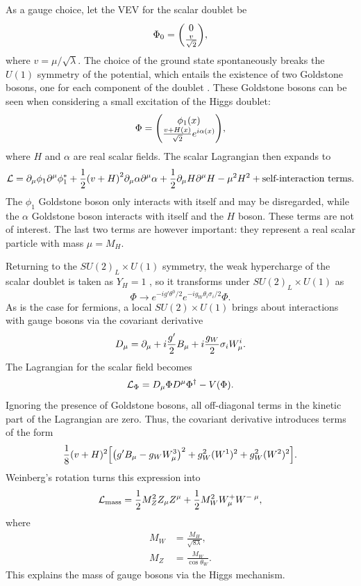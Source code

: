 As a gauge choice, let the VEV for the scalar doublet be
\begin{equation}
    \Phi_0 = \mqty (0 \\ \frac{v}{\sqrt{2}}),
\end{equation}
where $v=\mu/\sqrt{\lambda}$. The choice of the ground state spontaneously breaks the $U(1)$ symmetry of the potential, which entails the existence of two Goldstone bosons, one for each component of the doublet \cite{goldberg_standard_2017}. These Goldstone bosons can be seen when considering a small excitation of the Higgs doublet:
\begin{equation}
    \Phi =\mqty (\phi_1(x) \\ \frac{v+H(x)}{\sqrt{2}}e^{i\alpha(x)}),
\end{equation}
where $H$ and $\alpha$ are real scalar fields.
The scalar Lagrangian then expands to
\begin{equation}
    \mathcal{L} = \partial_{\mu} \phi_1 \partial^{\mu} \phi_1^* + \frac{1}{2}\qty(v+H)^2 \partial_{\mu} \alpha \partial^{\mu} \alpha + \frac{1}{2}\partial_{\mu} H \partial^{\mu} H - \mu^2 H^2 + \text{self-interaction terms}.
\end{equation}
The $\phi_1$ Goldstone boson only interacts with itself and may be disregarded, while the $\alpha$ Goldstone boson interacts with itself and the $H$ boson. These terms are not of interest. The last two terms are however important: they represent a real scalar particle with mass $\mu = M_H$.

Returning to the $SU(2)_L\times U(1)$ symmetry, the weak hypercharge of the scalar doublet is taken as $Y_H = 1$ \cite{goldberg_standard_2017}, so it transforms under $SU(2)_L\times U(1)$ as
\begin{equation}
    \Phi \rightarrow e^{-ig'\theta^0/2}e^{-ig_W\theta_i\sigma_i/2}\Phi.
\end{equation}
As is the case for fermions, a local $SU(2)\times U(1)$ brings about interactions with gauge bosons via the covariant derivative 
\begin{equation}
    D_\mu = \partial_{\mu} + i\frac{g'}{2}B_\mu + i \frac{g_W}{2} \sigma_i W^{i}_{\mu}.
\end{equation}
The Lagrangian for the scalar field becomes
\begin{equation}
    \mathcal{L}_{\Phi} = D_\mu \Phi D^\mu \Phi^\dagger - V(\Phi).
\end{equation}
Ignoring the presence of Goldstone bosons, all off-diagonal terms in the kinetic part of the Lagrangian are zero. Thus, the covariant derivative introduces terms of the form
\begin{equation}
    \frac{1}{8}(v+H)^2\qty[\qty(g' B_\mu - g_W W_{\mu}^3)^2 + g_W^2(W^1)^2 + g_W^2(W^2)^2].
\end{equation}
Weinberg's rotation turns this expression into
\begin{equation}
    \mathcal{L}_{\text{mass}} = \frac{1}{2} M_Z^2 Z_{\mu}Z^{\mu} + \frac{1}{2} M_W^2 W^+_{\mu} W^{-\;\mu},
\end{equation}
where
\begin{align}
    M_W &= \frac{M_H}{\sqrt{8\lambda}},\\
    M_Z &= \frac{M_W}{\cos{\theta_W}}.
\end{align}
This explains the mass of gauge bosons via the Higgs mechanism.


